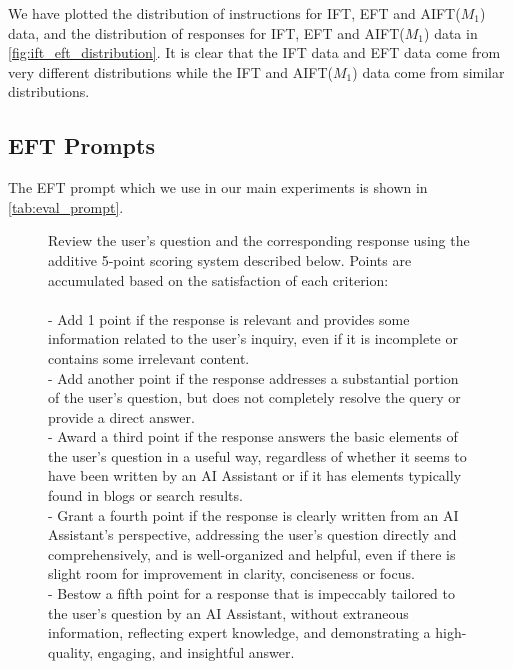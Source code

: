 \documentclass{article}
\begin{document}
We have plotted the distribution of instructions for IFT, EFT and AIFT($M_1$) data, and the distribution of responses for IFT, EFT and AIFT($M_1$) data in \autoref{fig:ift_eft_distribution}. It is clear that the IFT data and EFT data come from very different distributions while the IFT and AIFT($M_1$) data come from similar distributions.

\subsection{EFT Prompts}
\label{app:xian_eft_prompt}


The EFT prompt which we use in our main experiments is shown in \autoref{tab:eval_prompt}. 
\begin{figure}[t]
\centering
\small
\begin{tcolorbox}[colback=green!10!white, %
                  colframe=green!30!white, %
                  width=0.99\linewidth, %
                  arc=4mm, %
                  auto outer arc,
                  ]
Review the user's question and the corresponding response using the additive 5-point scoring system described below. Points are accumulated based on the satisfaction of each criterion:\\
\\
- Add 1 point if the response is relevant and provides some information related to the user's inquiry, even if it is incomplete or contains some irrelevant content.\\
- Add another point if the response addresses a substantial portion of the user's question, but does not completely resolve the query or provide a direct answer.\\
- Award a third point if the response answers the basic elements of the user's question in a useful way, regardless of whether it seems to have been written by an AI Assistant or if it has elements typically found in blogs or search results.\\
- Grant a fourth point if the response is clearly written from an AI Assistant's perspective, addressing the user's question directly and comprehensively, and is well-organized and helpful, even if there is slight room for improvement in clarity, conciseness or focus.\\
- Bestow a fifth point for a response that is impeccably tailored to the user's question by an AI Assistant, without extraneous information, reflecting expert knowledge, and demonstrating a high-quality, engaging, and insightful answer.\\

\end{tcolorbox}
\end{figure}
\end{document}
